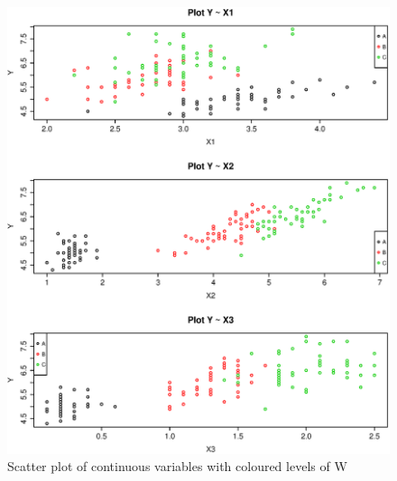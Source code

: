\documentclass{article}
\begin{document}
  \begin{figure}[H]
  \centering
  \includegraphics[scale=0.6]{scattercolors.eps}
  \caption{Scatter plot of continuous variables with coloured levels of W}
  \label{fig:scattercolors}
  \end{figure}
\end{document}
